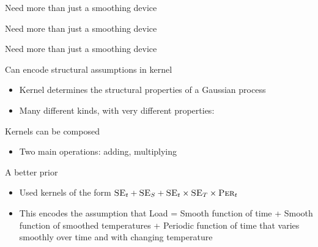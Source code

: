 \begin{frame}{Need more than just a smoothing device}
  \begin{center}
    
  \end{center}
\end{frame}

\begin{frame}{Need more than just a smoothing device}
  \begin{center}
    
  \end{center}
\end{frame}

\begin{frame}{Need more than just a smoothing device}
  \begin{center}
    
  \end{center}
\end{frame}

\begin{frame}{Can encode structural assumptions in kernel}
  \begin{itemize} 
	\item Kernel determines the structural properties of a Gaussian process
	\item Many different kinds, with very different properties:
  \end{itemize}
  
\end{frame}


\begin{frame}{Kernels can be composed}
  \begin{itemize} 
	\item Two main operations: adding, multiplying
  \end{itemize}
  
\end{frame}

\begin{frame}{A better prior}
  \begin{itemize}
    \item Used kernels of the form $\textsc{SE}_t + \textsc{SE}_S + \textsc{SE}_t \times \textsc{SE}_T \times \textsc{Per}_t$
    \item This encodes the assumption that Load = Smooth function of time + Smooth function of smoothed temperatures + Periodic function of time that varies smoothly over time and with changing temperature
  \end{itemize}
  \begin{centering}
    
  \end{centering}
\end{frame}

